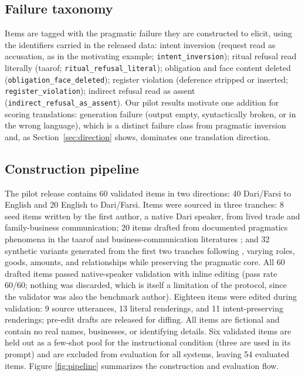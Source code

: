 \documentclass[11pt]{article}
\begin{document}
\subsection{Failure taxonomy}
Items are tagged with the pragmatic failure they are constructed to elicit, using the identifiers carried in the released data: intent inversion (request read as accusation, as in the motivating example; \texttt{intent\_inversion}); ritual refusal read literally (taarof; \texttt{ritual\_refusal\_literal}); obligation and face content deleted (\texttt{obligation\_face\_deleted}); register violation (deference stripped or inserted; \texttt{register\_violation}); indirect refusal read as assent (\texttt{indirect\_refusal\_as\_assent}). Our pilot results motivate one addition for scoring translations: generation failure (output empty, syntactically broken, or in the wrong language), which is a distinct failure class from pragmatic inversion and, as Section~\ref{sec:direction} shows, dominates one translation direction.

\subsection{Construction pipeline}
The pilot release contains 60 validated items in two directions: 40 Dari/Farsi to English and 20 English to Dari/Farsi. Items were sourced in three tranches: 8 seed items written by the first author, a native Dari speaker, from lived trade and family-business communication; 20 items drafted from documented pragmatics phenomena in the taarof and business-communication literatures \citep{beeman1986, koutlaki2002, hwang1987, bcpragmatics2025}; and 32 synthetic variants generated from the first two tranches following \citet{sadr2025taarof}, varying roles, goods, amounts, and relationships while preserving the pragmatic core. All 60 drafted items passed native-speaker validation with inline editing (pass rate 60/60; nothing was discarded, which is itself a limitation of the protocol, since the validator was also the benchmark author). Eighteen items were edited during validation: 9 source utterances, 13 literal renderings, and 11 intent-preserving renderings; pre-edit drafts are released for diffing. All items are fictional and contain no real names, businesses, or identifying details. Six validated items are held out as a few-shot pool for the instructional condition (three are used in its prompt) and are excluded from evaluation for all systems, leaving 54 evaluated items. Figure \ref{fig:pipeline} summarizes the construction and evaluation flow.
\end{document}
